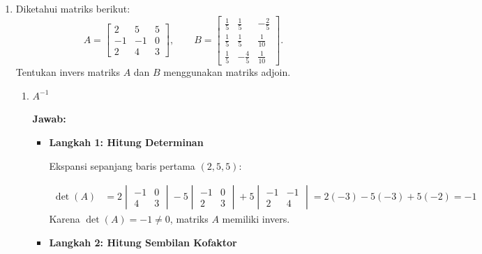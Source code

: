 \documentclass[10pt,a4paper]{article}
\newcounter{eqblock}
\newcommand{\reseteq}{%
  \stepcounter{eqblock}%
  \setcounter{equation}{0}%
  \renewcommand{\theHequation}{\arabic{eqblock}.\arabic{equation}}%
}
\begin{document}
\begin{enumerate}
\item Diketahui matriks berikut:
\[
A = \begin{bmatrix} 2 & 5 & 5 \\ -1 & -1 & 0 \\ 2 & 4 & 3 \end{bmatrix}, \qquad
B = \begin{bmatrix} \frac{1}{5} & \frac{1}{5} & -\frac{2}{5} \\[4pt] \frac{1}{5} & \frac{1}{5} & \frac{1}{10} \\[4pt] \frac{1}{5} & -\frac{4}{5} & \frac{1}{10} \end{bmatrix}.
\]
Tentukan invers matriks $A$ dan $B$ menggunakan matriks adjoin.
\begin{enumerate}

\item $A^{-1}$

\textbf{Jawab:}
\begin{itemize}
\item \textbf{Langkah 1: Hitung Determinan}

Ekspansi sepanjang baris pertama $(2, 5, 5)$:
\reseteq
\begin{align}
\det(A) &= 2\begin{vmatrix} -1 & 0 \\ 4 & 3 \end{vmatrix} - 5\begin{vmatrix} -1 & 0 \\ 2 & 3 \end{vmatrix} + 5\begin{vmatrix} -1 & -1 \\ 2 & 4 \end{vmatrix}
= 2(-3) - 5(-3) + 5(-2) = -1
\end{align}
Karena $\det(A) = -1 \neq 0$, matriks $A$ memiliki invers.

\item \textbf{Langkah 2: Hitung Sembilan Kofaktor}


\end{itemize}
\end{enumerate}
\end{enumerate}
\end{document}
